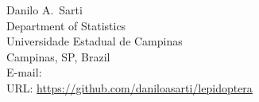 \documentclass[article]{jss}
\begin{document}
\begin{Address}
Danilo A.~Sarti\\
Department of Statistics\\
Universidade Estadual de Campinas\\
Campinas, SP, Brazil\\
E-mail: \\
URL: \url{https://github.com/daniloasarti/lepidoptera}
\end{Address}
\end{document}
